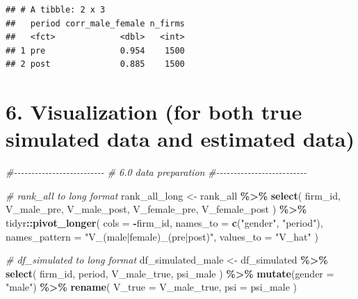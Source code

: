 \documentclass[
]{article}
\newenvironment{Shaded}{\begin{snugshade}}{\end{snugshade}}
\newcommand{\AttributeTok}[1]{\textcolor[rgb]{0.13,0.29,0.53}{#1}}
\newcommand{\CommentTok}[1]{\textcolor[rgb]{0.56,0.35,0.01}{\textit{#1}}}
\newcommand{\FunctionTok}[1]{\textcolor[rgb]{0.13,0.29,0.53}{\textbf{#1}}}
\newcommand{\NormalTok}[1]{#1}
\newcommand{\OtherTok}[1]{\textcolor[rgb]{0.56,0.35,0.01}{#1}}
\newcommand{\SpecialCharTok}[1]{\textcolor[rgb]{0.81,0.36,0.00}{\textbf{#1}}}
\newcommand{\StringTok}[1]{\textcolor[rgb]{0.31,0.60,0.02}{#1}}
\begin{document}
\begin{verbatim}
## # A tibble: 2 x 3
##   period corr_male_female n_firms
##   <fct>             <dbl>   <int>
## 1 pre               0.954    1500
## 2 post              0.885    1500
\end{verbatim}

\section{6. Visualization (for both true simulated data and estimated
data)}\label{visualization-for-both-true-simulated-data-and-estimated-data}

\begin{Shaded}
\begin{Highlighting}[]
\CommentTok{\#{-}{-}{-}{-}{-}{-}{-}{-}{-}{-}{-}{-}{-}{-}{-}{-}{-}{-}{-}{-}{-}{-}{-}{-}{-}{-}}
\CommentTok{\# 6.0 data preparation}
\CommentTok{\#{-}{-}{-}{-}{-}{-}{-}{-}{-}{-}{-}{-}{-}{-}{-}{-}{-}{-}{-}{-}{-}{-}{-}{-}{-}{-}}

\CommentTok{\# rank\_all to long format}
\NormalTok{rank\_all\_long }\OtherTok{\textless{}{-}}\NormalTok{ rank\_all }\SpecialCharTok{\%\textgreater{}\%}
    \FunctionTok{select}\NormalTok{(}
\NormalTok{        firm\_id,}
\NormalTok{        V\_male\_pre,}
\NormalTok{        V\_male\_post,}
\NormalTok{        V\_female\_pre,}
\NormalTok{        V\_female\_post}
\NormalTok{    ) }\SpecialCharTok{\%\textgreater{}\%}
\NormalTok{    tidyr}\SpecialCharTok{::}\FunctionTok{pivot\_longer}\NormalTok{(}
        \AttributeTok{cols =} \SpecialCharTok{{-}}\NormalTok{firm\_id,}
        \AttributeTok{names\_to =} \FunctionTok{c}\NormalTok{(}\StringTok{"gender"}\NormalTok{, }\StringTok{"period"}\NormalTok{),}
        \AttributeTok{names\_pattern =} \StringTok{"V\_(male|female)\_(pre|post)"}\NormalTok{,}
        \AttributeTok{values\_to =} \StringTok{"V\_hat"}
\NormalTok{    )}

\CommentTok{\# df\_simulated to long format}
\NormalTok{df\_simulated\_male }\OtherTok{\textless{}{-}}\NormalTok{ df\_simulated }\SpecialCharTok{\%\textgreater{}\%}
    \FunctionTok{select}\NormalTok{(}
\NormalTok{        firm\_id, period,}
\NormalTok{        V\_male\_true,}
\NormalTok{        psi\_male}
\NormalTok{    ) }\SpecialCharTok{\%\textgreater{}\%}
    \FunctionTok{mutate}\NormalTok{(}\AttributeTok{gender =} \StringTok{"male"}\NormalTok{) }\SpecialCharTok{\%\textgreater{}\%}
    \FunctionTok{rename}\NormalTok{(}
        \AttributeTok{V\_true =}\NormalTok{ V\_male\_true,}
        \AttributeTok{psi =}\NormalTok{ psi\_male}
\NormalTok{    )}


\end{Highlighting}
\end{Shaded}
\end{document}
